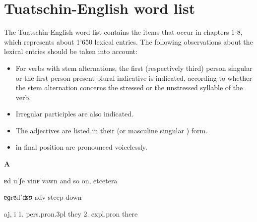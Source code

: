 \chapter{Tuatschin-English word list}
The Tuatschin-English word list contains the items that occur in chapters 1-8, which represents about 1'650 lexical entries. The following observations about the lexical entries should be taken into account:

\begin{itemize}
	\item For verbs with stem alternations, the first (respectively third) person singular  or the first person present plural indicative is indicated, according to whether the stem alternation concerns the stressed or the unstressed syllable of the verb.
	\item Irregular participles are also indicated.
	\item The adjectives are listed in their  (or masculine singular ) form.
	\item {} in final position are pronounced voicelessly.
\end{itemize}

\bigskip
{\noindent\LARGE\textbf{A}}
\bigskip







 {ɐd uˈʃe vinɐˈvawn} {and so on, etcetera}






 {ɐɡrɐdˈʥʊ} {adv} {steep down}


 {aj, i} {1.} {pers.pron.3pl} {they} {2.} {expl.pron} {there}

